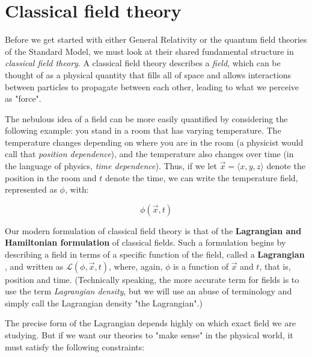 \chapter{Classical field theory}

Before we get started with either General Relativity or the quantum field theories of the Standard Model, we must look at their shared fundamental structure in \emph{classical field theory}. A classical field theory describes a \emph{field}, which can be thought of as a physical quantity that fills all of space and allows interactions between particles to propagate between each other, leading to what we perceive as "force".

The nebulous idea of a field can be more easily quantified by considering the following example: you stand in a room that has varying temperature. The temperature changes depending on where you are in the room (a physicist would call that \emph{position dependence}), and the temperature also changes over time (in the language of physics, \emph{time dependence}). Thus, if we let $\vec x = \langle x, y, z\rangle$ denote the position in the room and $t$ denote the time, we can write the temperature field, represented as $\phi$, with:

\begin{equation}
\phi(\vec x, t)
\end{equation}

Our modern formulation of classical field theory is that of the \textbf{Lagrangian and Hamiltonian formulation} of classical fields. Such a formulation begins by describing a field in terms of a specific function of the field, called a \textbf{Lagrangian} , and written as $\mathscr{L}(\phi, \vec x, t)$, where, again, $\phi$ is a function of $\vec x$ and $t$, that is, position and time. (Technically speaking, the more accurate term for fields is to use the term \emph{Lagrangian density}, but we will use an abuse of terminology and simply call the Lagrangian density "the Lagrangian".)

The precise form of the Lagrangian depends highly on which exact field we are studying. But if we want our theories to "make sense" in the physical world, it must satisfy the following constraints:

